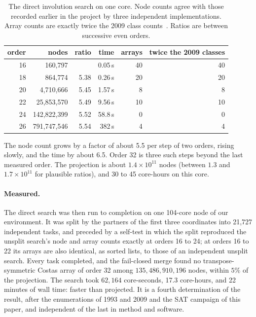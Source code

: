 \documentclass[11pt,a4paper]{article}
\theoremstyle{definition}
\begin{document}
\begin{table}[H]
\centering
\begin{tabular}{@{}rrrrrr@{}}
\toprule
order & nodes & ratio & time & arrays & twice the 2009 classes \\
\midrule
16 & 160{,}797 & & 0.05\,s & 40 & 40 \\
18 & 864{,}774 & 5.38 & 0.26\,s & 20 & 20 \\
20 & 4{,}710{,}666 & 5.45 & 1.57\,s & 8 & 8 \\
22 & 25{,}853{,}570 & 5.49 & 9.56\,s & 10 & 10 \\
24 & 142{,}822{,}399 & 5.52 & 58.8\,s & 0 & 0 \\
26 & 791{,}747{,}546 & 5.54 & 382\,s & 4 & 4 \\
\bottomrule
\end{tabular}
\caption{The direct involution search on one core. Node counts agree with those recorded earlier in
the project by three independent implementations. Array counts are exactly twice the 2009 class
counts~\cite{taylor2009}. Ratios are between successive even orders.}
\label{tab:direct}
\end{table}

The node count grows by a factor of about 5.5 per step of two orders, rising slowly, and the time by
about 6.5. Order 32 is three such steps beyond the last measured order. The projection is
about $1.4\times10^{11}$ nodes (between $1.3$ and $1.7\times10^{11}$ for plausible ratios), and 30 to 45
core-hours on this core.

\paragraph{Measured.} The direct search was then run to completion on one 104-core node of our
environment. It was split by the partners of the first three coordinates into 21{,}727 independent tasks,
and preceded by a self-test in which the split reproduced the unsplit search's node and array counts
exactly at orders 16 to 24; at orders 16 to 22 its arrays are also identical, as sorted lists, to those of an
independent unsplit search. Every task completed, and the fail-closed merge found no transpose-symmetric
Costas array of order 32 among $135{,}486{,}910{,}196$ nodes, within $5\%$ of the projection. The search took
$62{,}164$ core-seconds, 17.3 core-hours, and 22 minutes of wall time: faster than projected. It is a
fourth determination of the result, after the enumerations of 1993 and 2009 and the SAT campaign of this
paper, and independent of the last in method and software.
\end{document}
